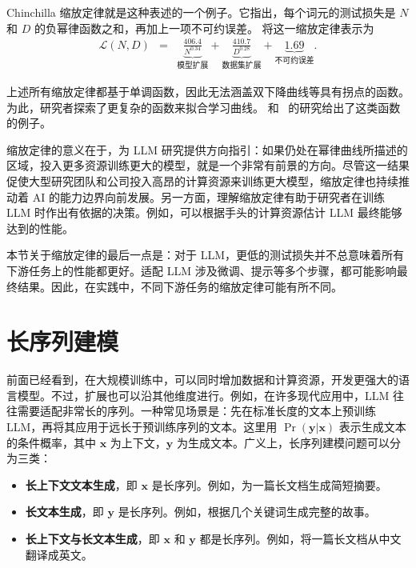 Chinchilla 缩放定律就是这种表述的一个例子。它指出，每个词元的测试损失是 $N$ 和 $D$ 的负幂律函数之和，再加上一项不可约误差。\citet{hoffmann-etal:2022training} 将这一缩放定律表示为
\begin{eqnarray}
\mathcal{L}(N,D) & = & \underbrace{\frac{406.4}{N^{0.34}}}_{\textrm{模型扩展}} + \underbrace{\frac{410.7}{D^{0.28}}}_{\textrm{数据集扩展}} + \underbrace{1.69}_{\textrm{不可约误差}}.
\end{eqnarray}

上述所有缩放定律都基于单调函数，因此无法涵盖双下降曲线等具有拐点的函数。为此，研究者探索了更复杂的函数来拟合学习曲线。\citet{alabdulmohsin-etal:2022revisiting} 和~\citet{caballero-etal:2023broken} 的研究给出了这类函数的例子。

缩放定律的意义在于，为 LLM 研究提供方向指引：如果仍处在幂律曲线所描述的区域，投入更多资源训练更大的模型，就是一个非常有前景的方向。尽管这一结果促使大型研究团队和公司投入高昂的计算资源来训练更大模型，缩放定律也持续推动着 AI 的能力边界向前发展。另一方面，理解缩放定律有助于研究者在训练 LLM 时作出有依据的决策。例如，可以根据手头的计算资源估计 LLM 最终能够达到的性能。

本节关于缩放定律的最后一点是：对于 LLM，更低的测试损失并不总意味着所有下游任务上的性能都更好。适配 LLM 涉及微调、提示等多个步骤，都可能影响最终结果。因此，在实践中，不同下游任务的缩放定律可能有所不同。


\section{长序列建模}
\label{sec:long-sequence-modeling}

\noindent 前面已经看到，在大规模训练中，可以同时增加数据和计算资源，开发更强大的语言模型。不过，扩展也可以沿其他维度进行。例如，在许多现代应用中，LLM 往往需要适配非常长的序列。一种常见场景是：先在标准长度的文本上预训练 LLM，再将其应用于远长于预训练序列的文本。这里用 $\Pr(\mathbf{y}|\mathbf{x})$ 表示生成文本的条件概率，其中 $\mathbf{x}$ 为上下文，$\mathbf{y}$ 为生成文本。广义上，长序列建模问题可以分为三类：

\begin{itemize}
\item \vspace{0.5em} \textbf{长上下文文本生成}，即 $\mathbf{x}$ 是长序列。例如，为一篇长文档生成简短摘要。
\item \vspace{0.3em} \textbf{长文本生成}，即 $\mathbf{y}$ 是长序列。例如，根据几个关键词生成完整的故事。
\item \vspace{0.3em} \textbf{长上下文与长文本生成}，即 $\mathbf{x}$ 和 $\mathbf{y}$ 都是长序列。例如，将一篇长文档从中文翻译成英文。
\end{itemize}
\vspace{0.5em}

